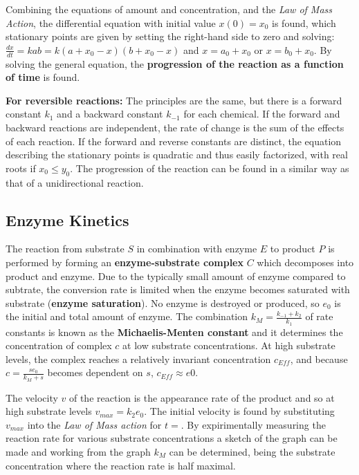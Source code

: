 \documentclass[10pt,a4paper]{report}
\begin{document}
	Combining the equations of amount and concentration, and the \emph{Law of Mass Action}, the differential equation with initial value $x(0) = x_0$ is found, which stationary points are given by setting the right-hand side to zero and solving: $\frac{dx}{dt} = kab = k(a + x_0 - x)(b + x_0 - x)$ and $x = a_0 + x_0$ or $x = b_0 + x_0$. 
	By solving the general equation, the \textbf{progression of the reaction as a function of time} is found.
	
	\textbf{For reversible reactions:} The principles are the same, but there is a forward constant $k_1$ and a backward constant $k_{-1}$ for each chemical. 
	If the forward and backward reactions are independent, the rate of change is the sum of the effects of each reaction. 
	If the forward and reverse constants are distinct, the equation describing the stationary points is quadratic and thus easily factorized, with real roots if $x_0 \leq y_0$. 
	The progression of the reaction can be found in a similar way as that of a unidirectional reaction.
	
	\subsection{Enzyme Kinetics}
	The reaction from substrate $S$ in combination with enzyme $E$ to product $P$ is performed by forming an \textbf{enzyme-substrate complex} $C$ which decomposes into product and enzyme. 
	Due to the typically small amount of enzyme compared to subtrate, the conversion rate is limited when the enzyme becomes saturated with substrate (\textbf{enzyme saturation}). 
	No enzyme is destroyed or produced, so $e_0$ is the initial and total amount of enzyme. 
	The combination $k_M = \frac{k_{-1} + k_2}{k_1}$ of rate constants is known as the \textbf{Michaelis-Menten constant} and it determines the concentration of complex $c$ at low substrate concentrations. At high substrate levels, the complex reaches a relatively invariant concentration $c_{Eff}$, and because $c = \frac{se_0}{k_M + s}$ becomes dependent on $s$, $c_{Eff} \approx e0$.
	
	The velocity $v$ of the reaction is the appearance rate of the product and so at high substrate levels $v_{max} = k_2e_0$. The initial velocity is found by substituting $v_{max}$ into the \emph{Law of Mass action} for $t = $. 
	By expirimentally measuring the reaction rate for various substrate concentrations a sketch of the graph can be made and working from the graph $k_M$ can be determined, being the substrate concentration where the reaction rate is half maximal.
	
\end{document}
